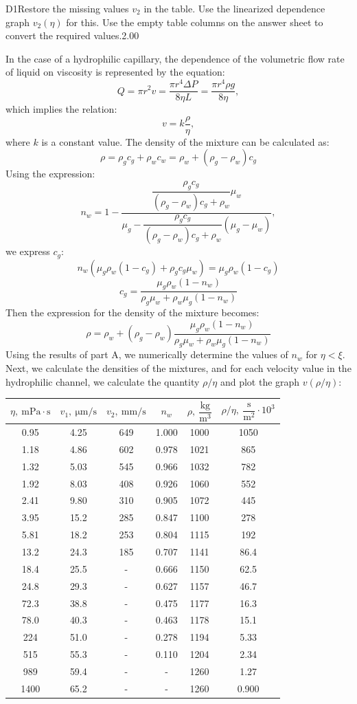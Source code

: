 \documentclass[11pt,a4paper]{article}
\begin{document}
\begin{solcard}{D1}{Restore the missing values $v_2$ in the table. Use the linearized dependence graph $v_2(\eta)$ for this. Use the empty table columns on the answer sheet to convert the required values.}{2.00}

In the case of a hydrophilic capillary, the dependence of the volumetric flow rate of liquid on viscosity is represented by the equation: \[Q=\pi r^2 v=\dfrac{\pi r^4 \Delta P}{8\eta L}=\dfrac{\pi r^4 \rho g}{8\eta },\] which implies the relation: \[v=k\dfrac{\rho}{\eta},\] where $k$ is a constant value. The density of the mixture can be calculated as: \[\rho=\rho_g c_g+\rho_w c_w=\rho_w+(\rho_g-\rho_w)c_g\] Using the expression: \[n_w=1-\frac{\dfrac{\rho_gc_g}{(\rho_g-\rho_w)c_g+\rho_w}\mu_w}{\mu_g-\dfrac{\rho_gc_g}{(\rho_g-\rho_w)c_g+\rho_w}(\mu_g-\mu_w)},\] we express $c_g$: \[n_w(\mu_g\rho_w(1-c_g)+\rho_g c_g\mu_w)=\mu_g\rho_w(1-c_g)\] \[c_g=\dfrac{\mu_g\rho_w(1-n_w)}{\rho_g\mu_w+\rho_w\mu_g(1-n_w)}\] Then the expression for the density of the mixture becomes: \[\rho=\rho_w+(\rho_g-\rho_w)\dfrac{\mu_g\rho_w(1-n_w)}{\rho_g\mu_w+\rho_w\mu_g(1-n_w)}\] Using the results of part A, we numerically determine the values of $n_w$ for $\eta<\xi$. Next, we calculate the densities of the mixtures, and for each velocity value in the hydrophilic channel, we calculate the quantity $\rho/\eta$ and plot the graph $v\left(\rho/\eta\right)$:

\begin{table}[H]
\centering
\begin{tabular}{|c|c|c|c|c|c|}
\hline
$\eta,~\mathrm{mPa}\cdot\mathrm{s}$ & $v_1,~\mathrm{\mu m}/\mathrm{s}$ & $v_2,~\mathrm{mm}/\mathrm{s}$ & $n_w$ & $\rho, ~\dfrac{\mathrm{kg}}{\mathrm{m}^3}$ & $\rho/\eta, ~\dfrac{\mathrm{s}}{\mathrm{m}^2}\cdot 10^3$ \\
\hline
0.95 & 4.25 & 649 & 1.000 & 1000 & 1050 \\
1.18 & 4.86 & 602 & 0.978 & 1021 & 865 \\
1.32 & 5.03 & 545 & 0.966 & 1032 & 782 \\
1.92 & 8.03 & 408 & 0.926 & 1060 & 552 \\
2.41 & 9.80 & 310 & 0.905 & 1072 & 445 \\
3.95 & 15.2 & 285 & 0.847 & 1100 & 278 \\
5.81 & 18.2 & 253 & 0.804 & 1115 & 192 \\
13.2 & 24.3 & 185 & 0.707 & 1141 & 86.4 \\
18.4 & 25.5 & - & 0.666 & 1150 & 62.5 \\
24.8 & 29.3 & - & 0.627 & 1157 & 46.7 \\
72.3 & 38.8 & - & 0.475 & 1177 & 16.3 \\
78.0 & 40.3 & - & 0.463 & 1178 & 15.1 \\
224 & 51.0 & - & 0.278 & 1194 & 5.33 \\
515 & 55.3 & - & 0.110 & 1204 & 2.34 \\
989 & 59.4 & - & - & 1260 & 1.27 \\
1400 & 65.2 & - & - & 1260 & 0.900 \\
\hline
\end{tabular}
\end{table}


\end{solcard}
\end{document}
